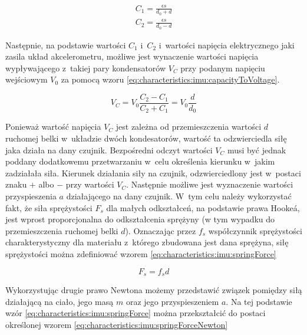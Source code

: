 \begin{subequations}
	\begin{align}
		C_1 = \frac{\epsilon s}{d_0 + d}             \\ 
		C_2 = \frac{\epsilon s}{d_0 - d}             
		\label{eq:characteristics:imu:acc:capacitor} 
	\end{align}
\end{subequations}
	
Następnie, na podstawie wartości $C_1$ i~$C_2$ i~wartości napięcia elektrycznego jaki zasila układ akcelerometru, możliwe jest wynaczenie wartości napięcia wypływającego z~takiej pary kondensatorów $V_C$ przy podanym napięciu wejściowym $V_0$ za pomocą wzoru \eqref{eq:characteristics:imu:capacityToVoltage}.

\begin{equation}
	V_C = V_0 \frac{C_2-C_1}{C_2+C_1} = V_0\frac{d}{d_0}
	\label{eq:characteristics:imu:capacityToVoltage}
\end{equation}
	
Ponieważ wartość napięcia $V_C$ jest zależna od przemieszczenia wartości $d$ ruchomej belki w~układzie dwóch kondesatorów, wartość ta odzwierciedla siłę jaka działa na dany czujnik. Bezpośredni odczyt wartości $V_C$ musi być jednak poddany dodatkowemu przetwarzaniu w~celu określenia kierunku w~jakim zadziałała siła. Kierunek działania siły na czujnik, odzwierciedlony jest w~postaci znaku $+$ albo $-$ przy wartości $V_C$. Następnie możliwe jest wyznaczenie wartości przyspieszenia $a$ działającego na dany czujnik. W~tym celu należy wykorzystać fakt, że siła sprężystości $F_s$ dla małych odkształceń, na podstawie prawa Hooke\'a, jest wprost proporcjonalna do odkształcenia sprężyny (w tym wypadku do przemieszczenia ruchomej belki $d$). Oznaczając przez $f_s$ współczynnik sprężystości charakterystyczny dla materiału z~którego zbudowana jest dana sprężyna, siłę sprężystości można zdefiniować wzorem \eqref{eq:characteristics:imu:springForce}

\begin{equation}
	F_s = f_s d
	\label{eq:characteristics:imu:springForce}
\end{equation}	
	
Wykorzystując drugie prawo Newtona możemy przedstawić związek pomiędzy siłą działającą na ciało, jego masą $m$ oraz jego przyspieszeniem $a$. Na tej podstawie wzór \eqref{eq:characteristics:imu:springForce} można przekształcić do postaci określonej wzorem \eqref{eq:characteristics:imu:springForceNewton}

